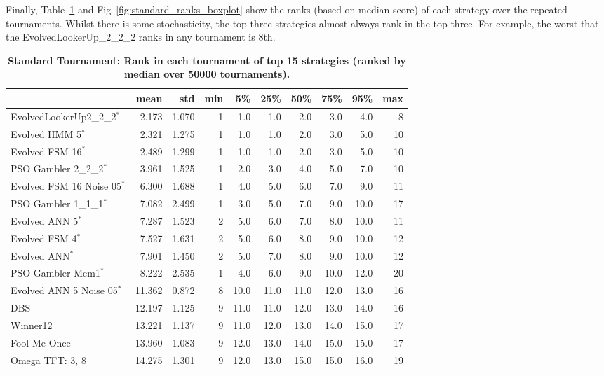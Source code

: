 \documentclass[10pt,letterpaper]{article}
\begin{document}
Finally, Table~\ref{tbl:standard_ranks} and
Fig~\ref{fig:standard_ranks_boxplot} show the ranks (based on median score)
of each strategy over the repeated tournaments. Whilst there is some
stochasticity, the top three strategies almost always rank in the top three. For
example, the worst that the EvolvedLookerUp\_2\_2\_2 ranks in any tournament
is 8th.


\begin{table}[!hbtp]
    \centering
        \caption{\bf Standard Tournament: Rank in each tournament
        of top 15 strategies (ranked by median over
        50000 tournaments).}
    \footnotesize
\begin{tabular}{lrrrrrrrrr}
\toprule
{} &    mean &    std &  min &    5\% &   25\% &   50\% &   75\% &   95\% &  max \\
\midrule
EvolvedLookerUp2\_2\_2$^{*}$    &   2.173 &  1.070 &    1 &   1.0 &   1.0 &   2.0 &   3.0 &   4.0 &    8 \\
Evolved HMM 5$^{*}$           &   2.321 &  1.275 &    1 &   1.0 &   1.0 &   2.0 &   3.0 &   5.0 &   10 \\
Evolved FSM 16$^{*}$          &   2.489 &  1.299 &    1 &   1.0 &   1.0 &   2.0 &   3.0 &   5.0 &   10 \\
PSO Gambler 2\_2\_2$^{*}$       &   3.961 &  1.525 &    1 &   2.0 &   3.0 &   4.0 &   5.0 &   7.0 &   10 \\
Evolved FSM 16 Noise 05$^{*}$ &   6.300 &  1.688 &    1 &   4.0 &   5.0 &   6.0 &   7.0 &   9.0 &   11 \\
PSO Gambler 1\_1\_1$^{*}$       &   7.082 &  2.499 &    1 &   3.0 &   5.0 &   7.0 &   9.0 &  10.0 &   17 \\
Evolved ANN 5$^{*}$           &   7.287 &  1.523 &    2 &   5.0 &   6.0 &   7.0 &   8.0 &  10.0 &   11 \\
Evolved FSM 4$^{*}$           &   7.527 &  1.631 &    2 &   5.0 &   6.0 &   8.0 &   9.0 &  10.0 &   12 \\
Evolved ANN$^{*}$             &   7.901 &  1.450 &    2 &   5.0 &   7.0 &   8.0 &   9.0 &  10.0 &   12 \\
PSO Gambler Mem1$^{*}$        &   8.222 &  2.535 &    1 &   4.0 &   6.0 &   9.0 &  10.0 &  12.0 &   20 \\
Evolved ANN 5 Noise 05$^{*}$  &  11.362 &  0.872 &    8 &  10.0 &  11.0 &  11.0 &  12.0 &  13.0 &   16 \\
DBS                           &  12.197 &  1.125 &    9 &  11.0 &  11.0 &  12.0 &  13.0 &  14.0 &   16 \\
Winner12                      &  13.221 &  1.137 &    9 &  11.0 &  12.0 &  13.0 &  14.0 &  15.0 &   17 \\
Fool Me Once                  &  13.960 &  1.083 &    9 &  12.0 &  13.0 &  14.0 &  15.0 &  15.0 &   17 \\
Omega TFT: 3, 8               &  14.275 &  1.301 &    9 &  12.0 &  13.0 &  15.0 &  15.0 &  16.0 &   19 \\
\bottomrule
\end{tabular}
        \label{tbl:standard_ranks}
\end{table}
\end{document}
